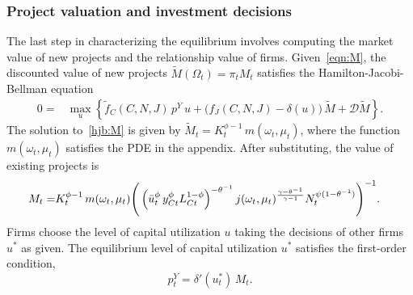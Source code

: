 \documentclass[12pt]{article}
\begin{document}



\subsubsection{Project valuation and investment decisions}

The last step in characterizing the equilibrium involves computing the market value of new projects and the relationship value  of firms. Given~\eqref{eqn:M}, the discounted value of new projects  $\tilde M(\Omega_t)=\pi_t {M_t}$   satisfies the Hamilton-Jacobi-Bellman equation
\begin{align}\label{hjb:M}
0=&\max_ u \left\{  \tilde f_C(C , N , J )  \, p^Y  \,u   +  \Big( f_J(C,N, J) - \delta(u)    \Big)\, \tilde M     +  \mathcal{D}   \tilde  M  \right\}.
\end{align}
The solution to~\eqref{hjb:M} is given by $\tilde M_t    = K^{\phi-1}_t \,m(\omega_t, \mu_t)$,  where the function $m(\omega_t, \mu_t)$ satisfies the PDE in the appendix. After substituting, the value of existing projects  is
\begin{align}\notag
M_t    =& K^{\phi-1}_t \,m(\omega_t, \mu_t) \Bigg(  \left( {  \bar u_t^\phi\, y_{Ct}^\phi L_{Ct}^{1-\phi}  } \right)^{   -\theta^{-1} }   j(\omega_t, \mu_t) ^{\frac{\gamma-\theta^{-1}}{\gamma-1} } N_t^{\psi(1-\theta^{-1})} \Bigg)^{-1}.
\end{align}
Firms choose the level of capital utilization $u$ taking the decisions of other firms $u^*$ as given. The equilibrium level of capital utilization $u^*$ satisfies the first-order condition,
\begin{equation}
 p^Y_t = \delta'(u^*_t) \, M_t.
\end{equation}
\end{document}
